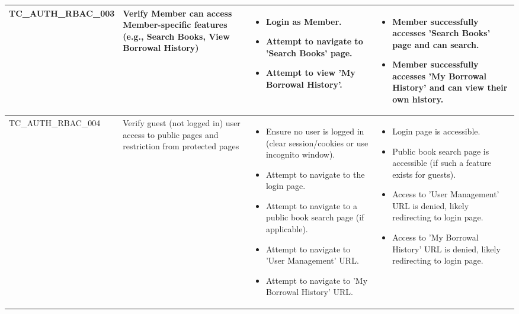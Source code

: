 \begin{longtable}{|>{\scriptsize\raggedright\arraybackslash}p{3.5cm}|>{\raggedright\arraybackslash}p{3.5cm}|>{\raggedright\arraybackslash}p{4cm}|>{\raggedright\arraybackslash}p{4cm}|}
TC\_AUTH\_RBAC\_003 & Verify Member can access Member-specific features (e.g., Search Books, View Borrowal History) & 
    \begin{itemize}[noitemsep, topsep=0pt, partopsep=0pt, leftmargin=*]
        \item Login as Member.
        \item Attempt to navigate to 'Search Books' page.
        \item Attempt to view 'My Borrowal History'.
    \end{itemize} & 
    \begin{itemize}[noitemsep, topsep=0pt, partopsep=0pt, leftmargin=*]
        \item Member successfully accesses 'Search Books' page and can search.
        \item Member successfully accesses 'My Borrowal History' and can view their own history.
    \end{itemize} \\ \hline
TC\_AUTH\_RBAC\_004 & Verify guest (not logged in) user access to public pages and restriction from protected pages & 
    \begin{itemize}[noitemsep, topsep=0pt, partopsep=0pt, leftmargin=*]
        \item Ensure no user is logged in (clear session/cookies or use incognito window).
        \item Attempt to navigate to the login page.
        \item Attempt to navigate to a public book search page (if applicable).
        \item Attempt to navigate to 'User Management' URL.
        \item Attempt to navigate to 'My Borrowal History' URL.
    \end{itemize} & 
    \begin{itemize}[noitemsep, topsep=0pt, partopsep=0pt, leftmargin=*]
        \item Login page is accessible.
        \item Public book search page is accessible (if such a feature exists for guests).
        \item Access to 'User Management' URL is denied, likely redirecting to login page.
        \item Access to 'My Borrowal History' URL is denied, likely redirecting to login page.
    \end{itemize} \\ \hline

\end{longtable}